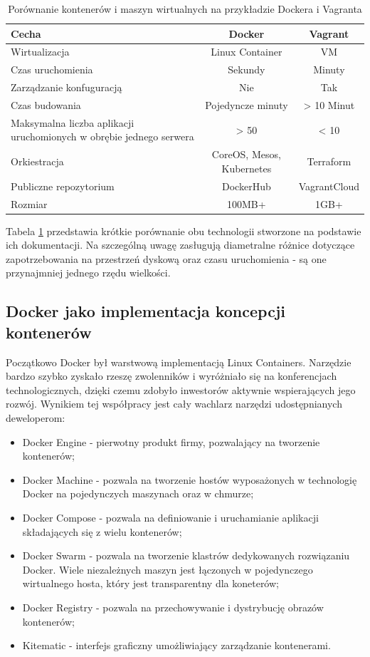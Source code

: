 \begin{table}[h]
\centering 
\caption{Porównanie kontenerów i maszyn wirtualnych na przykładzie Dockera i Vagranta \cite{docker, vagrant}}
\label{table:vm2docker}
	\begin{tabular}{|p{5cm}|c|c|}
		\hline
		Cecha & Docker & Vagrant \\
		\hline
		Wirtualizacja & Linux Container & VM \\
		\hline
		Czas uruchomienia & Sekundy & Minuty \\
		\hline
		Zarządzanie konfuguracją & Nie & Tak \\
		\hline
		Czas budowania & Pojedyncze minuty & > 10 Minut \\
		\hline
		Maksymalna liczba aplikacji uruchomionych w obrębie jednego serwera & > 50 & < 10 \\
		\hline
		Orkiestracja & CoreOS, Mesos, Kubernetes & Terraform \\
		\hline
		Publiczne repozytorium & DockerHub & VagrantCloud \\
		\hline
		Rozmiar & 100MB+ & 1GB+\\
		\hline
	\end{tabular}
\end{table}

Tabela \ref{table:vm2docker} przedstawia krótkie porównanie obu technologii stworzone na podstawie ich dokumentacji. Na szczególną uwagę zasługują diametralne różnice dotyczące zapotrzebowania na przestrzeń dyskową oraz czasu uruchomienia - są one przynajmniej jednego rzędu wielkości.

\subsection{Docker jako implementacja koncepcji kontenerów}

Początkowo Docker był warstwową implementacją Linux Containers. Narzędzie bardzo szybko zyskało rzeszę zwolenników i wyróżniało się na konferencjach technologicznych, dzięki czemu zdobyło inwestorów aktywnie wspierających jego rozwój. Wynikiem tej współpracy jest cały wachlarz narzędzi udostępnianych deweloperom:

\begin{itemize}
\item Docker Engine - pierwotny produkt firmy, pozwalający na tworzenie kontenerów;
\item Docker Machine - pozwala na tworzenie hostów wyposażonych w technologię Docker na pojedynczych maszynach oraz w chmurze;
\item Docker Compose - pozwala na definiowanie i uruchamianie aplikacji składających się z wielu kontenerów;
\item Docker Swarm - pozwala na tworzenie klastrów dedykowanych rozwiązaniu Docker. Wiele niezależnych maszyn jest łączonych w pojedynczego wirtualnego hosta, który jest transparentny dla koneterów;
\item Docker Registry - pozwala na przechowywanie i dystrybucję obrazów kontenerów;
\item Kitematic - interfejs graficzny umożliwiający zarządzanie kontenerami.
\end{itemize}

